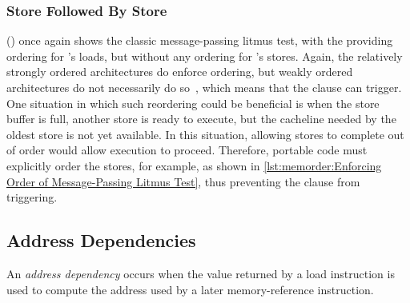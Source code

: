\begin{listing}[tbp]

\caption{Message-Passing Litmus Test, No Writer Ordering (No Ordering)}
\label{lst:memorder:Message-Passing Litmus Test; No Writer Ordering (No Ordering)}
\end{listing}

\subsubsection{Store Followed By Store}
\label{sec:memorder:Store Followed By Store}

()
once again shows the classic message-passing litmus test, with the
 providing ordering for 's loads, but without
any ordering for 's stores.
Again, the relatively strongly ordered architectures do enforce ordering,
but weakly ordered architectures do not necessarily do
so~\cite{JadeAlglave2011ppcmem}, which means that the
 clause can trigger.
One situation in which such reordering could be beneficial is when
the store buffer is full, another store is ready to execute, but the
cacheline needed by the oldest store is not yet available.
In this situation, allowing stores to complete out of order would
allow execution to proceed.
Therefore, portable code must explicitly order the stores, for
example, as shown in
\cref{lst:memorder:Enforcing Order of Message-Passing Litmus Test},
thus preventing the  clause from triggering.

\QuickQuizEnd

\subsection{Address Dependencies}
\label{sec:memorder:Address Dependencies}

An \emph{address dependency} occurs when the value returned by a load
instruction is used to compute the address used by a later memory-reference
instruction.

